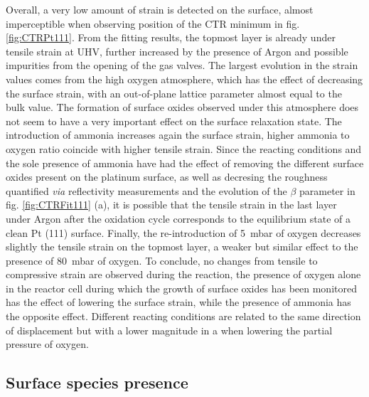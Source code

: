 Overall, a very low amount of strain is detected on the surface, almost imperceptible when observing position of the CTR minimum in fig. \ref{fig:CTRPt111}.
From the fitting results, the topmost layer is already under tensile strain at UHV, further increased by the presence of Argon and possible impurities from the opening of the gas valves.
The largest evolution in the strain values comes from the high oxygen atmosphere, which has the effect of decreasing the surface strain, with an out-of-plane lattice parameter almost equal to the bulk value.
The formation of surface oxides observed under this atmosphere does not seem to have a very important effect on the surface relaxation state.
The introduction of ammonia increases again the surface strain, higher ammonia to oxygen ratio coincide with higher tensile strain.
Since the reacting conditions and the sole presence of ammonia have had the effect of removing the different surface oxides present on the platinum surface, as well as decresing the roughness quantified \textit{via} reflectivity measurements and the evolution of the $\beta$ parameter in fig. \ref{fig:CTRFit111} (a), it is possible that the tensile strain in the last layer under Argon after the oxidation cycle corresponds to the equilibrium state of a clean Pt (111) surface.
Finally, the re-introduction of \qty{5}{\milli\bar} of oxygen decreases slightly the tensile strain on the topmost layer, a weaker but similar effect to the presence of \qty{80}{\milli\bar} of oxygen.
To conclude, no changes from tensile to compressive strain are observed during the reaction, the presence of oxygen alone in the reactor cell during which the growth of surface oxides has been monitored has the effect of lowering the surface strain, while the presence of ammonia has the opposite effect.
Different reacting conditions are related to the same direction of displacement but with a lower magnitude in a when lowering the partial pressure of oxygen.

\subsection{Surface species presence}

